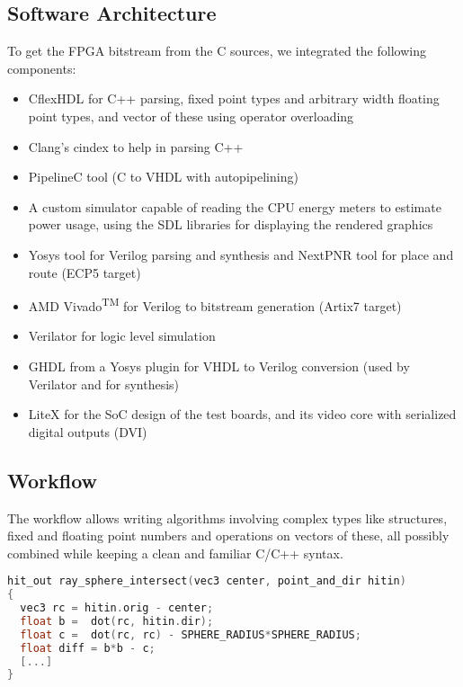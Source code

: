 \documentclass[conference]{IEEEtran}
\begin{document}
\subsection{Software Architecture}

To get the FPGA bitstream from the C sources, we integrated the following components:

\begin{itemize}
\item CflexHDL\cite{cflexhdl} for C++ parsing, fixed point types and arbitrary width floating point types, and vector of these using operator overloading
\item Clang’s cindex\cite{cindex} to help in parsing C++
\item PipelineC\cite{pipelinec} tool (C to VHDL with autopipelining)
\item A custom simulator capable of reading the CPU energy meters to estimate power usage, using the SDL\cite{sdllib} libraries for displaying the rendered graphics
\item Yosys\cite{yosys} tool for Verilog parsing and synthesis and NextPNR\cite{nextpnr} tool for place and route (ECP5 target)
\item AMD Vivado\textsuperscript{TM} for Verilog to bitstream generation (Artix7 target)
\item Verilator for logic level simulation
\item GHDL\cite{GHDL} from a Yosys plugin\cite{ghdlplugin} for VHDL to Verilog conversion (used by Verilator and for synthesis)
\item LiteX\cite{litex} for the SoC design of the test boards, and its video core with serialized digital outputs (DVI)
\end{itemize}


\subsection{Workflow}

The workflow allows writing algorithms involving complex types like structures, fixed and floating point numbers and operations on vectors of these, all possibly combined while keeping a clean and familiar C/C++ syntax.

\begin{lstlisting}[language=C++]
hit_out ray_sphere_intersect(vec3 center, point_and_dir hitin)
{
  vec3 rc = hitin.orig - center;
  float b =  dot(rc, hitin.dir);
  float c =  dot(rc, rc) - SPHERE_RADIUS*SPHERE_RADIUS;
  float diff = b*b - c;
  [...]
}
\end{lstlisting}
\end{document}
